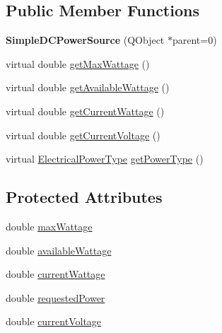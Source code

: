 \subsection*{Public Member Functions}
\begin{DoxyCompactItemize}
\item 
\hypertarget{class_challenger604_systems_1_1_simple_d_c_power_source_a874e451053b69d48b2bbdf924ce05dde}{{\bfseries Simple\-D\-C\-Power\-Source} (Q\-Object $\ast$parent=0)}\label{class_challenger604_systems_1_1_simple_d_c_power_source_a874e451053b69d48b2bbdf924ce05dde}

\item 
virtual double \hyperlink{class_challenger604_systems_1_1_simple_d_c_power_source_ad6285e377af915c21bf15637732f0291}{get\-Max\-Wattage} ()
\item 
virtual double \hyperlink{class_challenger604_systems_1_1_simple_d_c_power_source_a47085e7418e1e327552bd4339d08621a}{get\-Available\-Wattage} ()
\item 
virtual double \hyperlink{class_challenger604_systems_1_1_simple_d_c_power_source_ac1f53b3d602f8279f3b80bf9280b62d9}{get\-Current\-Wattage} ()
\item 
virtual double \hyperlink{class_challenger604_systems_1_1_simple_d_c_power_source_a19a6be7acae4e8183a0b03f0e948f659}{get\-Current\-Voltage} ()
\item 
virtual \hyperlink{namespace_challenger604_systems_a9ad1a793d94b97514092692cb7315afd}{Electrical\-Power\-Type} \hyperlink{class_challenger604_systems_1_1_simple_d_c_power_source_aa40311fa856ed2a149c9bf3586275632}{get\-Power\-Type} ()
\end{DoxyCompactItemize}
\subsection*{Protected Attributes}
\begin{DoxyCompactItemize}
\item 
double \hyperlink{class_challenger604_systems_1_1_simple_d_c_power_source_a7ccc3391b03c04b09f6792e0a44b026b}{max\-Wattage}
\item 
double \hyperlink{class_challenger604_systems_1_1_simple_d_c_power_source_a1e32a5e348dca6e2043f539a434debd9}{available\-Wattage}
\item 
double \hyperlink{class_challenger604_systems_1_1_simple_d_c_power_source_a5c8c5b89f6d3cd3d332ee12ef893839c}{current\-Wattage}
\item 
double \hyperlink{class_challenger604_systems_1_1_simple_d_c_power_source_a37f983774689318c3cb0295380ce4bd7}{requested\-Power}
\item 
double \hyperlink{class_challenger604_systems_1_1_simple_d_c_power_source_a6d5b229b66f1e6396229561e9a9562e4}{current\-Voltage}
\end{DoxyCompactItemize}


